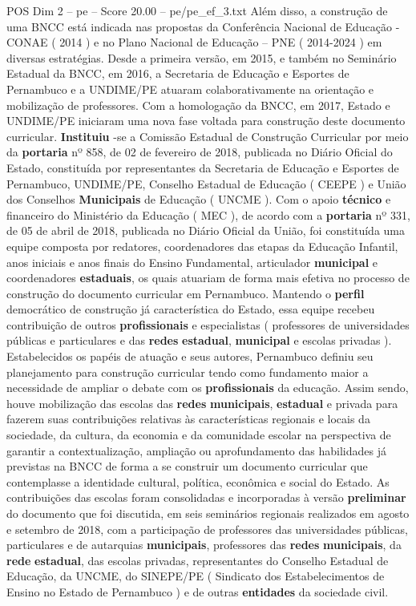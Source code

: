 \begin{textsample}{POS Dim 2 – pe – Score 20.00 – pe/pe\_ef\_3.txt}
Além disso, a construção de uma BNCC está indicada nas propostas da Conferência Nacional de Educação - CONAE ( 2014 ) e no Plano Nacional de Educação – PNE ( 2014-2024 ) em diversas estratégias.
Desde a primeira versão, em 2015, e também no Seminário Estadual da BNCC, em 2016, a Secretaria de Educação e Esportes de Pernambuco e a UNDIME/PE atuaram colaborativamente na orientação e mobilização de professores.
Com a homologação da BNCC, em 2017, Estado e UNDIME/PE iniciaram uma nova fase voltada para construção deste documento curricular. \textbf{Instituiu} -se a Comissão Estadual de Construção Curricular por meio da \textbf{portaria} nº 858, de 02 de fevereiro de 2018, publicada no Diário Oficial do Estado, constituída por representantes da Secretaria de Educação e Esportes de Pernambuco, UNDIME/PE, Conselho Estadual de Educação ( CEEPE ) e União dos Conselhos \textbf{Municipais} de Educação ( UNCME ).
Com o apoio \textbf{técnico} e financeiro do Ministério da Educação ( MEC ), de acordo com a \textbf{portaria} nº 331, de 05 de abril de 2018, publicada no Diário Oficial da União, foi constituída uma equipe composta por redatores, coordenadores das etapas da Educação Infantil, anos iniciais e anos finais do Ensino Fundamental, articulador \textbf{municipal} e coordenadores \textbf{estaduais}, os quais atuariam de forma mais efetiva no processo de construção do documento curricular em Pernambuco.
Mantendo o \textbf{perfil} democrático de construção já característica do Estado, essa equipe recebeu contribuição de outros \textbf{profissionais} e especialistas ( professores de universidades públicas e particulares e das \textbf{redes} \textbf{estadual}, \textbf{municipal} e escolas privadas ).
Estabelecidos os papéis de atuação e seus autores, Pernambuco definiu seu planejamento para construção curricular tendo como fundamento maior a necessidade de ampliar o debate com os \textbf{profissionais} da educação.
Assim sendo, houve mobilização das escolas das \textbf{redes} \textbf{municipais}, \textbf{estadual} e privada para fazerem suas contribuições relativas às características regionais e locais da sociedade, da cultura, da economia e da comunidade escolar na perspectiva de garantir a contextualização, ampliação ou aprofundamento das habilidades já previstas na BNCC de forma a se construir um documento curricular que contemplasse a identidade cultural, política, econômica e social do Estado.
As contribuições das escolas foram consolidadas e incorporadas à versão \textbf{preliminar} do documento que foi discutida, em seis seminários regionais realizados em agosto e setembro de 2018, com a participação de professores das universidades públicas, particulares e de autarquias \textbf{municipais}, professores das \textbf{redes} \textbf{municipais}, da \textbf{rede} \textbf{estadual}, das escolas privadas, representantes do Conselho Estadual de Educação, da UNCME, do SINEPE/PE ( Sindicato dos Estabelecimentos de Ensino no Estado de Pernambuco ) e de outras \textbf{entidades} da sociedade civil.

\end{textsample}
